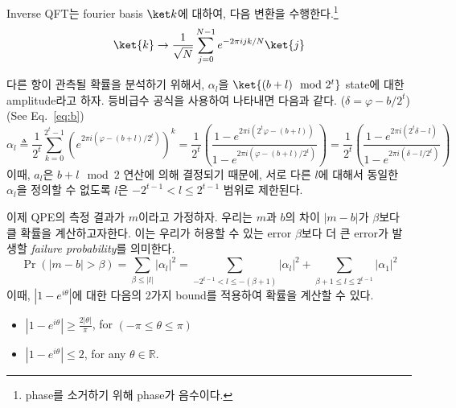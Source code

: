 \begin{definition}\label{def:IQFT}
  Inverse QFT는 fourier basis $\ket k$에 대하여, 다음 변환을 수행한다.\footnote{phase를 소거하기 위해 phase가 음수이다.}
  $$ \ket{k} \rightarrow \frac{1}{\sqrt{N}} \sum_{j=0}^{N-1} e^{-2\pi i jk/N} \ket{j}  $$
\end{definition}

\vspace{1em}
다른 항이 관측될 확률을 분석하기 위해서, $\alpha_l$을 $\ket{(b+l) \mod 2^t}$ state에 대한 amplitude라고 하자. 등비급수 공식을 사용하여 나타내면 다음과 같다. ($\delta = \varphi - b/2^t$) (See Eq.~\eqref{eq:b})
\begin{equation*}
  \alpha_l \triangleq \frac{1}{2^t} \sum_{k=0}^{2^t-1}\left(e^{2 \pi i\left(\varphi-(b+l) / 2^t\right)}\right)^k=\frac{1}{2^t}\left(\frac{1-e^{2 \pi i\left(2^t \varphi-(b+l)\right)}}{1-e^{2 \pi i\left(\varphi-(b+l) / 2^t\right)}}\right)=\frac{1}{2^t}\left(\frac{1-e^{2 \pi i\left(2^t \delta-l\right)}}{1-e^{2 \pi i\left(\delta-l / 2^t\right)}}\right)
\end{equation*}
이때, $a_l$은 $b+l \mod 2$ 연산에 의해 결정되기 때문에, 서로 다른 $l$에 대해서 동일한 $\alpha_l$을 정의할 수 없도록 $l$은 $-2^{t-1} < l \le 2^{t-1}$ 범위로 제한된다.

\vspace{1em}

이제 QPE의 측정 결과가 $m$이라고 가정하자. 우리는 $m$과 $b$의 차이 $|m-b|$가 $\beta$보다 클 확률을 계산하고자한다. 이는 우리가 허용할 수 있는 error $\beta$보다 더 큰 error가 발생할 \textit{failure probability}를 의미한다.
\begin{equation}
  \Pr(|m-b| > \beta) = \sum_{\beta \le |l|} |\alpha_l|^2 = \sum_{-2^{t-1}<l \le -(\beta + 1)} |\alpha_l|^2 + \sum_{\beta+1 \le l \le 2^{t-1}}  |\alpha_1|^2 \label{eq:QPE-error-prob}
\end{equation}
이때, $|1-e^{i\theta}|$에 대한 다음의 2가지 bound를 적용하여 확률을 계산할 수 있다.
\begin{itemize}
  \item $|1-e^{i\theta}| \ge \frac{2 |\theta|}{\pi}$, for $(-\pi \le \theta \le \pi)$
  \item $|1-e^{i\theta}| \le 2$, for any $\theta \in \mathbb R$.
\end{itemize}

